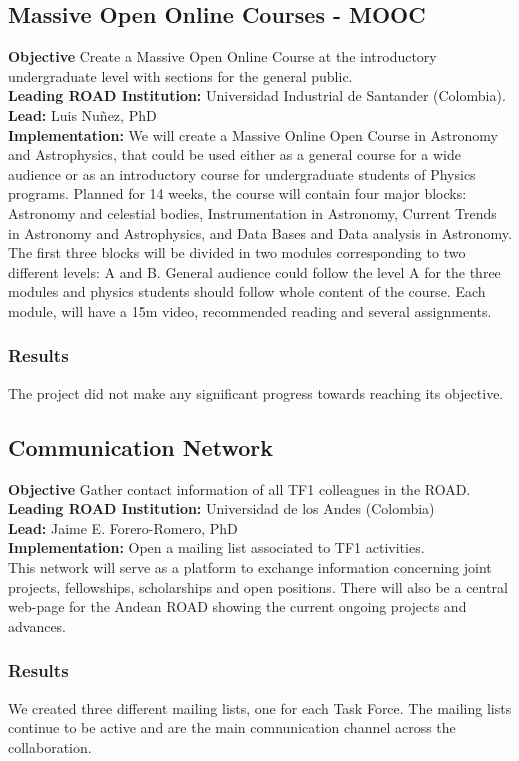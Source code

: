 \subsection{Massive Open Online Courses - MOOC}
\textbf{Objective} Create a Massive Open Online Course at the
introductory undergraduate level with sections for the general
public. \\
\textbf{Leading ROAD Institution:} Universidad Industrial de Santander
(Colombia). \\
\textbf{Lead: }Luis Nuñez, PhD  \\
\textbf{Implementation:} We will create a Massive Online Open Course
in Astronomy and Astrophysics, that could be used either as a general
course for a wide audience or as an introductory course for
undergraduate students of Physics programs. Planned for 14 weeks, the
course will contain four major blocks: Astronomy and celestial bodies,
Instrumentation in Astronomy, Current Trends in Astronomy and
Astrophysics, and Data Bases and Data analysis in Astronomy. The first
three blocks will be divided in two modules corresponding to two
different levels: A and B. General audience could follow the level A
for the three modules and physics students should follow whole content
of the course. 
Each module, will have a 15m video, recommended reading and several
assignments. 
\\ 


\subsubsection{Results}

The project  did not make any significant progress towards reaching its
objective.  



\subsection{Communication Network}
\textbf{Objective} Gather contact information of all TF1 colleagues in the ROAD.
\\
\textbf{Leading ROAD Institution:} Universidad de los Andes (Colombia)
\\
\textbf{Lead:} Jaime E. Forero-Romero, PhD
\\
\textbf{Implementation:} Open a mailing list associated to TF1 activities.
\\
This network will serve as a platform to exchange information
concerning joint projects, fellowships, scholarships and open
positions. There will also be a central web-page for the Andean ROAD
showing the current ongoing projects and advances. 

\subsubsection{Results}
We created three different mailing lists, one for each Task Force. The
mailing lists continue to be active  and are the main comnunication
channel across the collaboration. 


